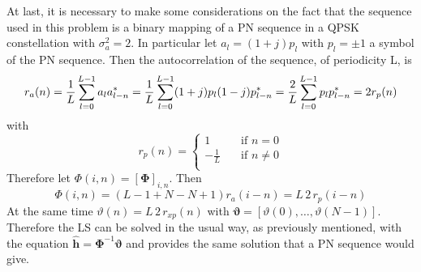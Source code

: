 \documentclass[10pt]{article}
\begin{document}
At last, it is necessary to make some considerations on the fact that the sequence used in this problem is a binary mapping of a PN sequence in a QPSK constellation with $\sigma_a^2 = 2$. In particular let $a_l = (1+j) p_l$ with $p_l = \pm 1$ a symbol of the PN sequence. Then the autocorrelation of the sequence, of periodicity L, is
\begin{equation}
	r_a(n) = \frac{1}{L}\sum_{l = 0}^{L-1} a_l a^*_{l-n} = \\
	\frac{1}{L}\sum_{l = 0}^{L-1} (1+j)p_l (1-j)p^*_{l-n} = 
	\frac{2}{L} \sum_{l= 0}^{L-1} p_l p^*_{l-n} = 2 r_p(n)
\end{equation}
with 
\begin{equation}
	r_p(n) = 
  	\begin{cases}
    1       & \quad \text{if } n =0 \\
    -\frac{1}{L}  & \quad \text{if } n \neq 0 \\
  \end{cases}
\end{equation}
Therefore let $\Phi(i, n) = [\mathbf{\Phi}]_{i, n}$. Then
\begin{equation}
	\Phi(i, n) = (L -1 + N - N + 1)r_a(i-n) = L \, 2 \, r_p(i-n)
\end{equation}
At the same time $\vartheta(n) = L \, 2 \, r_{xp}(n)$ with $\boldsymbol{\vartheta} = [\vartheta(0), \dots, \vartheta(N-1)]$.
Therefore the LS can be solved in the usual way, as previously mentioned, with the equation $\hat{\mathbf{h}}= \mathbf{\Phi}^{-1} \boldsymbol{\vartheta}$ and provides the same solution that a PN sequence would give. 
\end{document}
